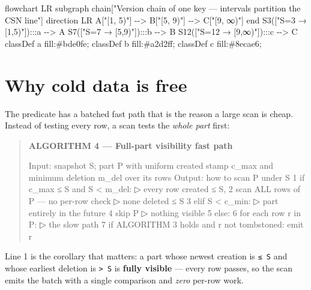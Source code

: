 \documentclass[
  11pt,
  openany]{book}
\newenvironment{Shaded}{}{}
\newcommand{\NormalTok}[1]{#1}
\begin{document}
\begin{Shaded}
\begin{Highlighting}[]
\NormalTok{flowchart LR}
\NormalTok{    subgraph chain["Version chain of one key — intervals partition the CSN line"]}
\NormalTok{      direction LR}
\NormalTok{      A["[1, 5)"] {-}{-}\textgreater{} B["[5, 9)"] {-}{-}\textgreater{} C["[9, ∞)"]}
\NormalTok{    end}
\NormalTok{    S3(["S=3 → [1,5)"]):::a {-}{-}\textgreater{} A}
\NormalTok{    S7(["S=7 → [5,9)"]):::b {-}{-}\textgreater{} B}
\NormalTok{    S12(["S=12 → [9,∞)"]):::c {-}{-}\textgreater{} C}
\NormalTok{    classDef a fill:\#bde0fe; classDef b fill:\#a2d2ff; classDef c fill:\#8ecae6;}
\end{Highlighting}
\end{Shaded}

\section{Why cold data is free}\label{why-cold-data-is-free-1}

The predicate has a batched fast path that is the reason a large scan is
cheap. Instead of testing every row, a scan tests the \emph{whole part}
first:

\begin{quote}
\textbf{ALGORITHM 4 --- Full-part visibility fast path}

\begin{Shaded}
\begin{Highlighting}[]
\NormalTok{Input:  snapshot S; part P with uniform created stamp c\_max}
\NormalTok{        and minimum deletion m\_del over its rows}
\NormalTok{Output: how to scan P under S}
\NormalTok{1  if c\_max ≤ S and S \textless{} m\_del:                     ▷ every row created ≤ S,}
\NormalTok{2      scan ALL rows of P — no per{-}row check        ▷ none deleted ≤ S}
\NormalTok{3  elif S \textless{} c\_min:                                  ▷ part entirely in the future}
\NormalTok{4      skip P                                        ▷ nothing visible}
\NormalTok{5  else:}
\NormalTok{6      for each row r in P:                          ▷ the slow path}
\NormalTok{7          if ALGORITHM 3 holds and r not tombstoned: emit r}
\end{Highlighting}
\end{Shaded}
\end{quote}

Line 1 is the corollary that matters: a part whose newest creation is
\texttt{≤\ S} and whose earliest deletion is \texttt{\textgreater{}\ S}
is \textbf{fully visible} --- every row passes, so the scan emits the
batch with a single comparison and \emph{zero} per-row work.
\end{document}
